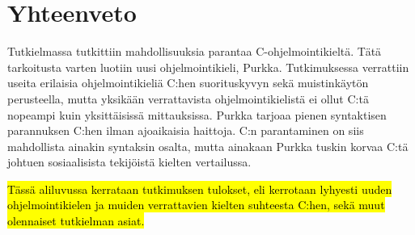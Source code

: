 \section{Yhteenveto}

Tutkielmassa tutkittiin mahdollisuuksia parantaa C-ohjelmointikieltä. Tätä
tarkoitusta varten luotiin uusi ohjelmointikieli, Purkka. Tutkimuksessa
verrattiin useita erilaisia ohjelmointikieliä C:hen suorituskyvyn sekä
muistinkäytön perusteella, mutta yksikään verrattavista ohjelmointikielistä ei
ollut C:tä nopeampi kuin yksittäisissä mittauksissa. Purkka tarjoaa pienen
syntaktisen parannuksen C:hen ilman ajoaikaisia haittoja. C:n parantaminen on
siis mahdollista ainakin syntaksin osalta, mutta ainakaan Purkka tuskin korvaa
C:tä johtuen sosiaalisista tekijöistä kielten vertailussa.

\hl{Tässä aliluvussa kerrataan tutkimuksen tulokset, eli kerrotaan lyhyesti
uuden ohjelmointikielen ja muiden verrattavien kielten suhteesta C:hen, sekä
muut olennaiset tutkielman asiat.}
